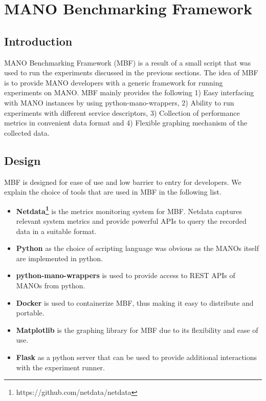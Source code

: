\section{MANO Benchmarking Framework} 

\subsection{Introduction}

MANO Benchmarking Framework (MBF) is a result of a small script that was used to run the experiments discussed in the previous sections. 
The idea of MBF is to provide MANO developers with a generic framework for running experiments on MANO. 
MBF mainly provides the following 1) Easy interfacing with MANO instances by using python-mano-wrappers, 2) Ability to run experiments with different service descriptors, 3) Collection of performance metrics in convenient data format and 4) Flexible graphing mechanism of the collected data. 


\subsection{Design}

MBF is designed for ease of use and low barrier to entry for developers. 
We explain the choice of tools that are used in MBF in the following list.

\begin{itemize}
	\item{\textbf{Netdata\footnote{https://github.com/netdata/netdata}}} is the metrics monitoring system for MBF. 
	Netdata captures relevant system metrics and provide powerful APIs to query the recorded data in a suitable format.
	\item{\textbf{Python}} as the choice of scripting language was obvious as the MANOs itself are implemented in python.
	\item{\textbf{python-mano-wrappers}} is used to provide access to REST APIs of MANOs from python.
	\item{\textbf{Docker}} is used to containerize MBF, thus making it easy to distribute and portable.
	\item{\textbf{Matplotlib}} is the graphing library for MBF due to its flexibility and ease of use.
	\item{\textbf{Flask}} as a python server that can be used to provide additional interactions with the experiment runner.

\end{itemize}


